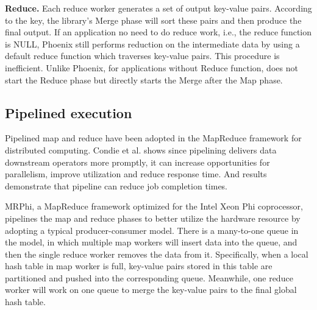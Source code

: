 {\bf Reduce.}
Each reduce worker generates a set of output key-value pairs.
According to the key, the library's Merge phase  will sort these pairs and then produce the final output. 
If an application no need to do reduce work, i.e., the reduce function is NULL,
Phoenix still performs reduction on the intermediate data by using a default reduce function which traverses key-value pairs. 
This procedure is inefficient. 
Unlike Phoenix, for applications without Reduce function, \myds does not start the Reduce phase but directly starts the Merge after the Map phase.


\subsection{Pipelined execution}
Pipelined map and reduce have been adopted 
in the MapReduce framework for distributed computing\cite{Condie2010mapreduce}. 
Condie et al. shows since pipelining delivers data downstream operators
more promptly, it can increase opportunities for
parallelism, improve utilization and reduce response
time.
And results demonstrate that pipeline can reduce job completion times.
 



MRPhi\cite{lu2013mrphi}, a MapReduce framework optimized for the Intel Xeon Phi coprocessor,
pipelines the map and reduce phases to better utilize the hardware resource by adopting a typical producer-consumer model.
There is a many-to-one queue in the model,  in which multiple map workers will insert data into the queue, and then the single reduce worker removes the data from it. 
Specifically, when a local hash table in map worker is full, key-value pairs stored in this table are partitioned and pushed into the corresponding queue. 
Meanwhile, one reduce worker will work on one queue to merge the key-value pairs to the final global hash table. 

